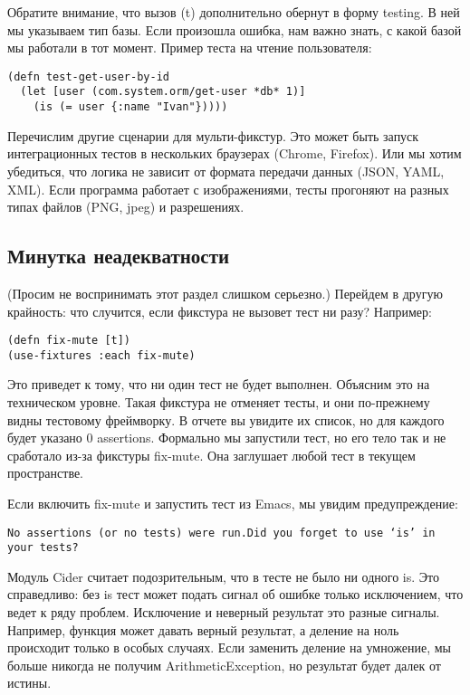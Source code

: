 Обратите внимание, что вызов (t) дополнительно обернут в форму testing. В ней мы
указываем тип базы. Если произошла ошибка, нам важно знать, с какой базой мы
работали в тот момент. Пример теста на чтение пользователя:

\begin{verbatim}
(defn test-get-user-by-id
  (let [user (com.system.orm/get-user *db* 1)]
    (is (= user {:name "Ivan"}))))
\end{verbatim}

Перечислим другие сценарии для мульти-фикстур. Это может быть запуск
интеграционных тестов в нескольких браузерах (Chrome, Firefox). Или мы хотим
убедиться, что логика не зависит от формата передачи данных (JSON, YAML,
XML). Если программа работает с изображениями, тесты прогоняют на разных типах
файлов (PNG, jpeg) и разрешениях.

\subsection{Минутка неадекватности}

(Просим не воспринимать этот раздел слишком серьезно.) Перейдем в другую
крайность: что случится, если фикстура не вызовет тест ни разу? Например:

\begin{verbatim}
(defn fix-mute [t])
(use-fixtures :each fix-mute)
\end{verbatim}

Это приведет к тому, что ни один тест не будет выполнен. Объясним это на
техническом уровне. Такая фикстура не отменяет тесты, и они по-прежнему видны
тестовому фреймворку. В отчете вы увидите их список, но для каждого будет
указано 0 assertions. Формально мы запустили тест, но его тело так и не
сработало из-за фикстуры fix-mute. Она заглушает любой тест в текущем
пространстве.

Если включить fix-mute и запустить тест из Emacs, мы увидим предупреждение:

\begin{verbatim}
No assertions (or no tests) were run.Did you forget to use ‘is’ in your tests?
\end{verbatim}

Модуль Cider считает подозрительным, что в тесте не было ни одного is. Это
справедливо: без is тест может подать сигнал об ошибке только исключением, что
ведет к ряду проблем. Исключение и неверный результат это разные
сигналы. Например, функция может давать верный результат, а деление на ноль
происходит только в особых случаях. Если заменить деление на умножение, мы
больше никогда не получим ArithmeticException, но результат будет далек от
истины.

